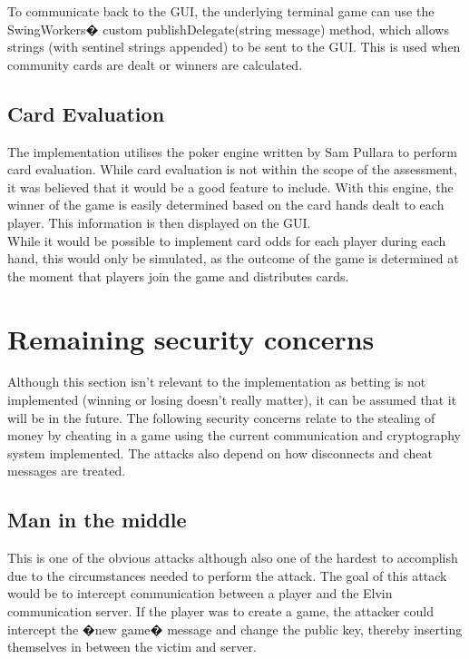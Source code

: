 \documentclass[11pt, oneside]{article}   	%
\begin{document}
To communicate back to the GUI, the underlying terminal game can use the SwingWorkers� custom publishDelegate(string message) method, which allows strings (with sentinel strings appended) to be sent to the GUI. This is used when community cards are dealt or winners are calculated.

\subsection{Card Evaluation}

The implementation utilises the poker engine written by Sam Pullara to perform card evaluation. While card evaluation is not within the scope of the assessment, it was believed that it would be a good feature to include. With this engine, the winner of the game is easily determined based on the card hands dealt to each player. This information is then displayed on the GUI.\\

While it would be possible to implement card odds for each player during each hand, this would only be simulated, as the outcome of the game is determined at the moment that players join the game and distributes cards.

\section{Remaining security concerns}
\label{sec:securityConcerns}

Although this section isn't relevant to the implementation as betting is not implemented (winning or losing doesn't really matter), it can be assumed that it will be in the future. The following security concerns relate to the stealing of money by cheating in a game using the current communication and cryptography system implemented. The attacks also depend on how disconnects and cheat messages are treated.\\

\subsection{Man in the middle}

This is one of the obvious attacks although also one of the hardest to accomplish due to the circumstances needed to perform the attack. The goal of this attack would be to intercept communication between a player and the Elvin communication server. If the player was to create a game, the attacker could intercept the �new game� message and change the public key, thereby inserting themselves in between the victim and server.\\
\end{document}
